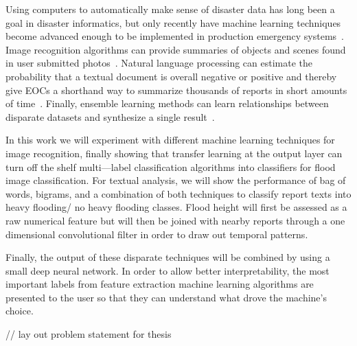   Using computers to automatically make sense of disaster data has long
  been a goal in disaster informatics, but only recently have machine
  learning techniques become advanced enough to be implemented in production
  emergency systems~\cite{meierDigitalHumanitariansHow2015}. Image
  recognition algorithms can provide summaries of objects and scenes found
  in user submitted photos~\cite{nguyenRapidClassificationCrisisRelated,
  donahueDeCAFDeepConvolutional2013}. Natural language processing can
  estimate the probability that a textual document is overall negative or
  positive and thereby give EOCs a shorthand way to summarize thousands of
  reports in short amounts of
  time~\cite{nguyenRapidClassificationCrisisRelated,
  nagyCrowdSentimentDetection2012}. Finally, ensemble learning methods can
  learn relationships between disparate datasets and synthesize a single
  result~\cite{mouzannarDamageIdentificationSocial2018}.
  
  In this work we will experiment with different machine learning techniques
  for image recognition, finally showing that transfer learning at the 
  output layer can turn off the shelf multi---label  classification
  algorithms into classifiers for flood image classification. For textual analysis, 
  we will show the performance of bag of words, bigrams, and a combination of 
  both techniques to classify report texts into heavy flooding/ no heavy flooding classes.
  Flood height will first be assessed as a raw numerical feature but will then be 
  joined with nearby reports through a one dimensional convolutional filter in order
  to draw out temporal patterns. 
  
  Finally, the output of these disparate techniques will be combined by using a 
  small deep neural network. In order to allow better interpretability, the
  most important labels from feature extraction machine learning algorithms are
  presented to the user so that they can understand what drove the machine's
  choice.
  
	// lay out problem statement for thesis
